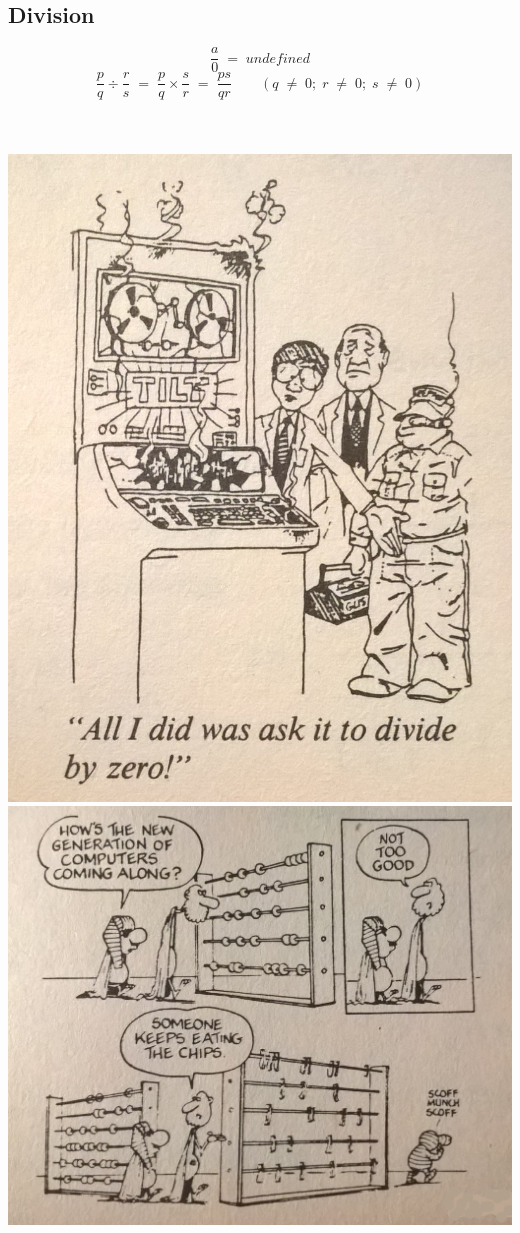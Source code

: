 \subsection{Division}
\[\frac{a}{0} \; = \; undefined\]
\[\frac{p}{q} \div \frac{r}{s} \; = \; \frac{p}{q} \times \frac{s}{r} \; = \; \frac{ps}{qr} \qquad (q \; \neq \; 0; \; r \; \neq \; 0; \; s \; \neq \; 0)\]
\\
\\
\begin{minipage}[t]{\linewidth}
\includegraphics[scale=0.2]{./image/Math/dividebyzero.jpg}
\includegraphics[scale=0.12]{./image/Math/newgencomputer.jpg}
\end{minipage}
\newpage
